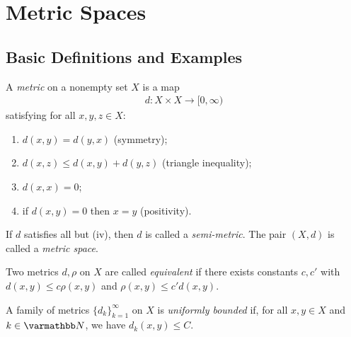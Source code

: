 \chapter{Metric Spaces}

\section{Basic Definitions and Examples}
    \begin{definition}
        A \textit{metric} on a nonempty set $X$ is a map
            \begin{equation*}
            \begin{split}
                d: X \times X \rightarrow [0,\infty)
            \end{split}
            \end{equation*}
        satisfying for all $x,y,z \in X$:
            \begin{enumerate}[label = (\arabic*),itemsep=1pt,topsep=3pt]
                \item $d(x,y) = d(y,x)$ (symmetry);
                \item $d(x,z) \leq d(x,y) + d(y,z)$ (triangle inequality);
                \item $d(x,x) = 0$;
                \item if $d(x,y) = 0$ then $x=y$ (positivity).
            \end{enumerate}
        If $d$ satisfies all but (iv), then $d$ is called a \textit{semi-metric}. The pair $(X,d)$ is called a \textit{metric space}.
    \end{definition}

    \begin{definition}
        Two metrics $d,\rho$ on $X$ are called \textit{equivalent} if there exists constants $c,c'$ with $d(x,y) \leq c \rho(x,y)$ and $\rho(x,y) \leq c'd(x,y)$.
    \end{definition}

    \begin{definition}
        A family of metrics $\{d_k\}_{k = 1}^\infty$ on $X$ is \textit{uniformly bounded} if, for all $x,y \in X$ and $k \in \bfN$, we have $d_k(x,y) \leq C$.
    \end{definition}

